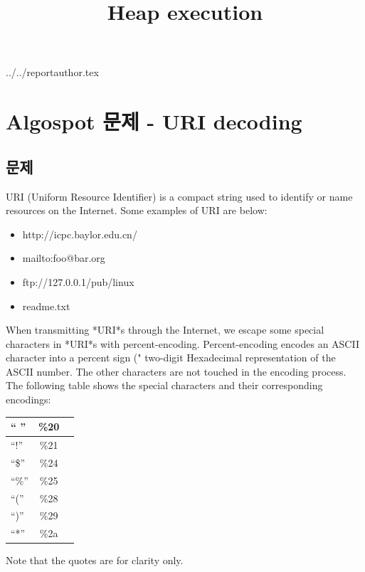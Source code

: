 \documentclass {article}
\begin{document}
\title {Heap execution}
 {../../reportauthor.tex}
\maketitle

\section {Algospot 문제 - URI decoding}
\subsection {문제}
URI (Uniform Resource Identifier) is a compact string used to identify or name resources on the Internet. Some examples of URI are below:

\begin{itemize}
\item http://icpc.baylor.edu.cn/
\item mailto:foo@bar.org
\item ftp://127.0.0.1/pub/linux
\item readme.txt
\end{itemize}

When transmitting *URI*s through the Internet, we escape some
special characters in *URI*s with percent-encoding. Percent-encoding
encodes an ASCII character into a percent sign ("%
two-digit Hexadecimal representation of the ASCII number. The other
characters are not touched in the encoding process. The following
table shows the special characters and their corresponding encodings:
\newline

\begin {tabular}{| l | c | r |}
  \hline
  `` '' & \%20 \\ \hline
  ``!'' & \%21 \\ \hline
  ``\$'' & \%24 \\ \hline
  ``\%'' & \%25 \\ \hline
  ``('' & \%28 \\ \hline
  ``)'' & \%29 \\ \hline
  ``*'' & \%2a \\ \hline
\end{tabular}
\linebreak
\newline
\newline

Note that the quotes are for clarity only.
\end{document}
